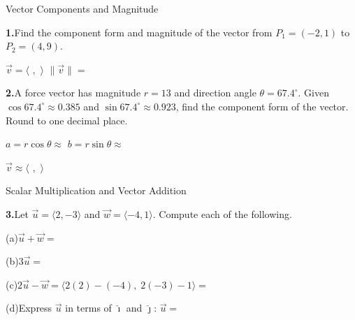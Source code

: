 \documentclass[10pt]{article}
\begin{document}
\namedateperiod

\vspace{0.10in}

\begin{notesbox}{Vector Components and Magnitude}

\textbf{1.}\quad Find the component form and magnitude of the vector from
$P_1 = (-2, 1)$ to $P_2 = (4, 9)$.

\vspace{4pt}
$\vec{v} = \langle$ \blank{2cm}$,$ \blank{2cm}$\rangle$ \qquad
$\|\vec{v}\| = $ \blank{5cm}

\vspace{14pt}
\textbf{2.}\quad A force vector has magnitude $r = 13$ and direction angle
$\theta = 67.4^\circ$. Given $\cos 67.4^\circ \approx 0.385$ and
$\sin 67.4^\circ \approx 0.923$, find the component form of the vector.
Round to one decimal place.

\vspace{4pt}
$a = r\cos\theta \approx $ \blank{3.5cm} \qquad
$b = r\sin\theta \approx $ \blank{3.5cm}

\vspace{4pt}
$\vec{v} \approx \langle$ \blank{2cm}$,$ \blank{2cm}$\rangle$

\end{notesbox}

\vspace{0.08in}

\begin{notesbox}{Scalar Multiplication and Vector Addition}

\textbf{3.}\quad Let $\vec{u} = \langle 2, -3\rangle$ and $\vec{w} = \langle -4, 1\rangle$.
Compute each of the following.

\vspace{4pt}
(a)\quad $\vec{u} + \vec{w} = $ \blank{5cm}

\vspace{8pt}
(b)\quad $3\vec{u} = $ \blank{5cm}

\vspace{8pt}
(c)\quad $2\vec{u} - \vec{w} = \langle 2(2)-(-4),\; 2(-3)-1 \rangle = $ \blank{5cm}

\vspace{8pt}
(d)\quad Express $\vec{u}$ in terms of $\hat{\imath}$ and $\hat{\jmath}$:
$\vec{u} = $ \blank{5cm}

\end{notesbox}

\vspace{0.08in}
\end{document}
